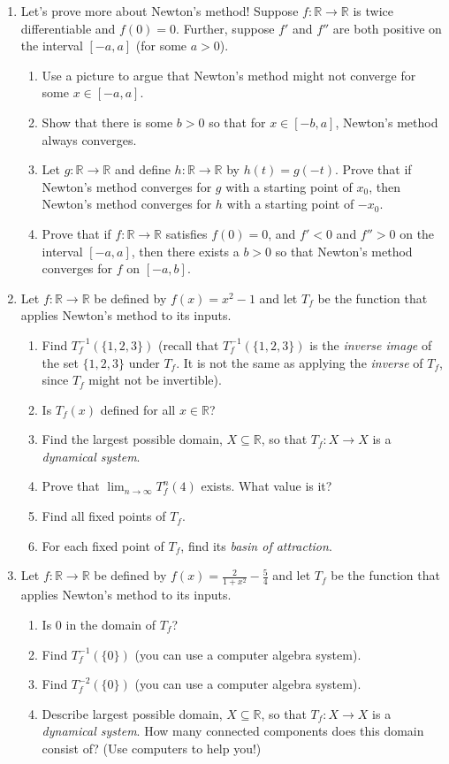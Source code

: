 \documentclass[letter]{article}
\newcommand{\R}{\mathbb{R}}
\begin{document}
\begin{enumerate}
		\item Let's prove more about Newton's method! Suppose $f:\R\to\R$ is twice differentiable and
			$f(0)=0$. Further, suppose $f'$ and $f''$ are both positive on the interval $[-a,a]$ (for
			some $a>0$). 
			\begin{enumerate}
				\item Use a picture to argue that Newton's method might not converge for some $x\in[-a,a]$.
				\item Show that there is some $b>0$ so that for $x\in[-b,a]$, Newton's method always converges.
				\item Let $g:\R\to\R$ and define $h:\R\to\R$ by $h(t)=g(-t)$. Prove that if Newton's method
					converges for $g$ with a starting point of $x_0$, then Newton's method converges
					for $h$ with a starting point of $-x_0$.
				\item Prove that if $f:\R\to\R$ satisfies $f(0)=0$, and $f' < 0$ and $f'' > 0$ on the interval
					$[-a,a]$, then there exists a $b>0$ so that Newton's method converges for
					$f$ on $[-a,b]$.
			\end{enumerate}

		\item Let $f:\R\to\R$ be defined by $f(x)=x^2-1$ and let $T_f$ be the function that applies Newton's method
			to its inputs.
			\begin{enumerate}
				\item Find $T_f^{-1}(\{1,2,3\})$ (recall that $T_f^{-1}(\{1,2,3\})$ is the \emph{inverse image}
					of the set $\{1,2,3\}$ under $T_f$. It is not the same as applying the \emph{inverse}
					of $T_f$, since $T_f$ might not be invertible).
				\item Is $T_f(x)$ defined for all $x\in \R$?
				\item Find the largest possible domain, $X\subseteq \R$, so that $T_f:X\to X$ is a \emph{dynamical
					system}.
				\item Prove that $\lim_{n\to\infty} T^n_f(4)$ exists. What value is it?
				\item Find all fixed points of $T_f$.
				\item For each fixed point of $T_f$, find its \emph{basin of attraction}.
			\end{enumerate}

		\item Let $f:\R\to\R$ be defined by $f(x)=\frac{2}{1+x^2}-\frac{5}{4}$ and let $T_f$ be the function that applies Newton's method
			to its inputs.
			\begin{enumerate}
				\item Is $0$ in the domain of $T_f$?
				\item Find $T_f^{-1}(\{0\})$ (you can use a computer algebra system).
				\item Find $T_f^{-2}(\{0\})$ (you can use a computer algebra system).
				\item Describe largest possible domain, $X\subseteq \R$, so that $T_f:X\to X$ is a \emph{dynamical
					system}. How many connected components does this domain consist of? (Use computers to help you!)
			\end{enumerate}
	\end{enumerate}
\end{document}

